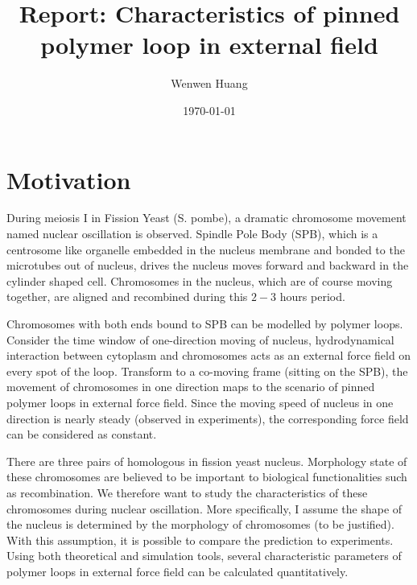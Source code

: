 \documentclass[12pt,a4paper]{article}
\begin{document}
\title{Report: Characteristics of pinned polymer loop in external field}
\author{Wenwen Huang}
\date{\today}

\maketitle

\section{Motivation}
\label{sec:motivation}

During meiosis I in Fission Yeast (S. pombe), a dramatic chromosome movement
named nuclear oscillation is observed. Spindle Pole Body (SPB), which is a
centrosome like organelle embedded in the nucleus membrane and bonded to the
microtubes out of nucleus, drives the nucleus moves forward and backward in the
cylinder shaped cell. Chromosomes in the nucleus, which are of course moving
together, are aligned and recombined during this $2-3$ hours period. 

Chromosomes with both ends bound to SPB can be modelled by polymer loops. Consider
the time window of one-direction moving of nucleus, hydrodynamical interaction between
cytoplasm and chromosomes acts as an external force field on every spot of the
loop. Transform to a co-moving frame (sitting on the SPB), the movement of
chromosomes in one direction maps to the scenario of pinned polymer loops in
external force field. Since the moving speed of nucleus in one direction is
nearly steady (observed in experiments), the corresponding force field can be
considered as constant.

There are three pairs of homologous in fission yeast nucleus. Morphology state
of these chromosomes are believed to be important to biological functionalities
such as recombination. We therefore want to study the characteristics of these
chromosomes during nuclear oscillation. More specifically, I assume the shape
of the nucleus is determined by the morphology of chromosomes (to be justified).
With this assumption, it is possible to compare the prediction to experiments. 
Using both theoretical and simulation tools, several characteristic parameters
of polymer loops in external force field can be calculated quantitatively.  
\end{document}
